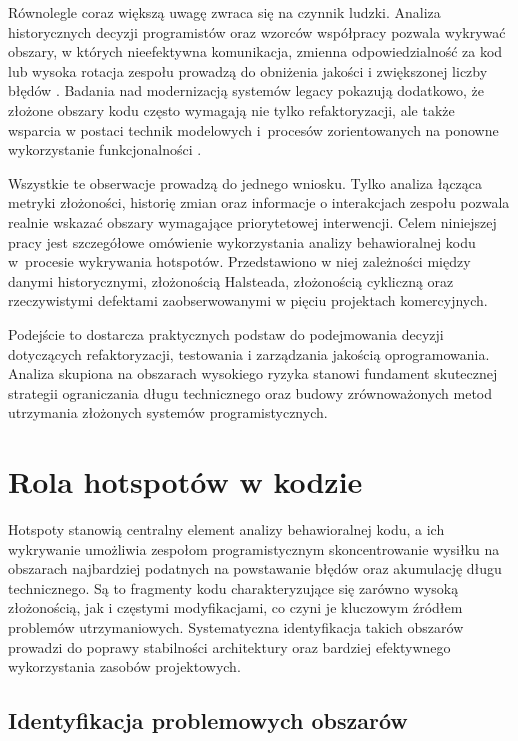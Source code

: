 Równolegle coraz większą uwagę zwraca się na czynnik ludzki. Analiza historycznych decyzji programistów oraz wzorców współpracy pozwala wykrywać obszary, w których nieefektywna komunikacja, zmienna odpowiedzialność za kod lub wysoka rotacja zespołu prowadzą do obniżenia jakości i zwiększonej liczby błędów \cite{Paixao2017,Pedreira2015,Barreto2021}. Badania nad modernizacją systemów legacy pokazują dodatkowo, że złożone obszary kodu często wymagają nie tylko refaktoryzacji, ale także wsparcia w postaci technik modelowych i~procesów zorientowanych na ponowne wykorzystanie funkcjonalności \cite{diBiase2019}. 

Wszystkie te obserwacje prowadzą do jednego wniosku. Tylko analiza łącząca metryki złożoności, historię zmian oraz informacje o interakcjach zespołu pozwala realnie wskazać obszary wymagające priorytetowej interwencji. Celem niniejszej pracy jest szczegółowe omówienie wykorzystania analizy behawioralnej kodu w~procesie wykrywania hotspotów. Przedstawiono w niej zależności między danymi historycznymi, złożonością Halsteada, złożonością cykliczną oraz rzeczywistymi defektami zaobserwowanymi w pięciu projektach komercyjnych. 

Podejście to dostarcza praktycznych podstaw do podejmowania decyzji dotyczących refaktoryzacji, testowania i zarządzania jakością oprogramowania. Analiza skupiona na obszarach wysokiego ryzyka stanowi fundament skutecznej strategii ograniczania długu technicznego oraz budowy zrównoważonych metod utrzymania złożonych systemów programistycznych.

\section{Rola hotspotów w kodzie}

Hotspoty stanowią centralny element analizy behawioralnej kodu, a ich wykrywanie umożliwia zespołom programistycznym skoncentrowanie wysiłku na obszarach najbardziej podatnych na powstawanie błędów oraz akumulację długu technicznego. Są to fragmenty kodu charakteryzujące się zarówno wysoką złożonością, jak i częstymi modyfikacjami, co czyni je kluczowym źródłem problemów utrzymaniowych. Systematyczna identyfikacja takich obszarów prowadzi do poprawy stabilności architektury oraz bardziej efektywnego wykorzystania zasobów projektowych.

\subsection{Identyfikacja problemowych obszarów}

